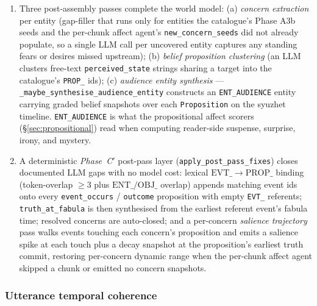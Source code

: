 \documentclass[11pt]{article}
\begin{document}
\begin{enumerate}
\item Three post-assembly passes complete the world model:
      (a) \emph{concern extraction} per entity (gap-filler that
      runs only for entities the catalogue's Phase A3b seeds
      and the per-chunk affect agent's \texttt{new\_concern\_seeds}
      did not already populate, so a single LLM call per
      uncovered entity captures any standing fears or desires
      missed upstream); (b) \emph{belief proposition clustering}
      (an LLM clusters free-text \texttt{perceived\_state}
      strings sharing a target into the catalogue's
      \texttt{PROP\_} ids); (c) \emph{audience entity synthesis}
      --- \texttt{\_maybe\_synthesise\_audience\_entity}
      constructs an \texttt{ENT\_AUDIENCE} entity carrying
      graded belief snapshots over each \texttt{Proposition} on
      the syuzhet timeline. \texttt{ENT\_AUDIENCE} is what the
      propositional affect scorers (\S\ref{sec:propositional})
      read when computing reader-side suspense, surprise, irony,
      and mystery.
\item A deterministic \emph{Phase~C$'$} post-pass layer
      (\texttt{apply\_post\_pass\_fixes}) closes documented LLM
      gaps with no model cost: lexical $\mathrm{EVT}\_\!\to\!\mathrm{PROP}\_$
      binding (token-overlap $\geq 3$ plus
      $\mathrm{ENT}\_/\mathrm{OBJ}\_$ overlap) appends matching
      event ids onto every \texttt{event\_occurs} / \texttt{outcome}
      proposition with empty \texttt{EVT\_} referents;
      \texttt{truth\_at\_fabula} is then synthesised from the
      earliest referent event's fabula time; resolved concerns
      are auto-closed; and a per-concern \emph{salience trajectory}
      pass walks events touching each concern's proposition and
      emits a salience spike at each touch plus a decay snapshot
      at the proposition's earliest truth commit, restoring
      per-concern dynamic range when the per-chunk affect agent
      skipped a chunk or emitted no concern snapshots.
\end{enumerate}

\subsubsection{Utterance temporal coherence}
\label{sec:utterance-temporal}
\end{document}
